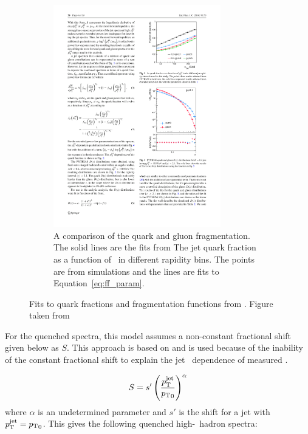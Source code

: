 \begin{figure}
\begin{subfigure}{.45\textwidth}
\includegraphics[width=0.8\textwidth]{figures/jetMeasurements/gluon_fragmentation}
\caption{A comparison of the  quark and gluon fragmentation. The solid lines are the fits from The jet quark fraction as a function of \ptjet\ in different rapidity bins. The points are from  simulations and the lines are fits to Equation~\ref{eq:ff_param}.}
\label{fig:gluon_fragmentation}
\end{subfigure}
\caption{Fits to quark fractions and fragmentation functions from .  Figure taken from \cite{Spousta:2015fca}}
\label{fig:EQ_pp_models}
\end{figure}


For the quenched spectra, this model assumes a non-constant fractional shift given below as $S$. This approach is based on \cite{baier2001quenching} and is used because of the inability of the constant fractional shift to explain the jet \pt\ dependence of measured \RAA. 

\begin{align}
S = s' \left( \frac{\mbox{$p_{\mathrm{T}}^{\mathrm{jet}}$}}{\mbox{$p_{\mathrm{T}}$}_0} \right) ^\alpha
\end{align}
where $\alpha$ is an undetermined parameter and $s'$ is the shift for a jet with $\mbox{$p_{\mathrm{T}}^{\mathrm{jet}}$} = \mbox{$p_{\mathrm{T}}$}_0$. This gives the following quenched high-\pt\ hadron spectra:

